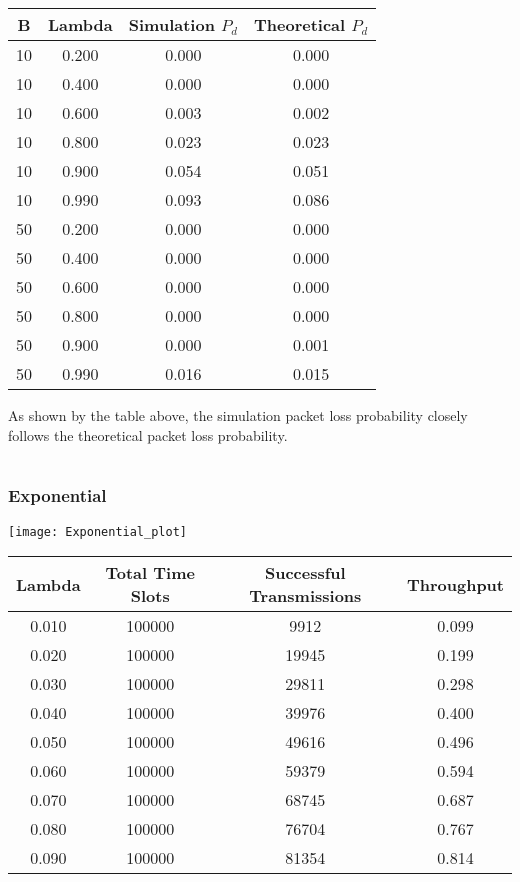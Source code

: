 \documentclass{article}
\begin{document}
\section{}
\begin{center}
\begin{tabular}{c | c | c | c}
    B   & Lambda  & Simulation $P_d$    & Theoretical $P_d$ \\
    \hline
    10  & 0.200   & 0.000   & 0.000 \\
    10  & 0.400   & 0.000   & 0.000 \\
    10  & 0.600   & 0.003   & 0.002 \\ 
    10  & 0.800   & 0.023   & 0.023 \\
    10  & 0.900   & 0.054   & 0.051 \\
    10  & 0.990   & 0.093   & 0.086 \\
    50  & 0.200   & 0.000   & 0.000 \\
    50  & 0.400   & 0.000   & 0.000 \\
    50  & 0.600   & 0.000   & 0.000 \\
    50  & 0.800   & 0.000   & 0.000 \\
    50  & 0.900   & 0.000   & 0.001 \\
    50  & 0.990   & 0.016   & 0.015 \\
\end{tabular}
\end{center}
As shown by the table above, the simulation packet loss probability closely follows the theoretical packet loss probability.

\part{}	
	
\section*{Exponential}
\begin{center}
\texttt{[image: Exponential\_plot]}
\begin{tabular}{c | c | c | c}
	Lambda    & Total Time Slots & Successful Transmissions & Throughput \\
	\hline
	0.010     & 100000    & 9912      & 0.099     \\
	0.020     & 100000    & 19945     & 0.199     \\
	0.030     & 100000    & 29811     & 0.298     \\
	0.040     & 100000    & 39976     & 0.400     \\
	0.050     & 100000    & 49616     & 0.496     \\
	0.060     & 100000    & 59379     & 0.594     \\
	0.070     & 100000    & 68745     & 0.687     \\
	0.080     & 100000    & 76704     & 0.767     \\
	0.090     & 100000    & 81354     & 0.814     \\
\end{tabular} \\
\end{center}
\end{document}
